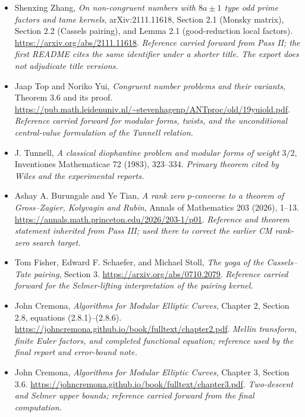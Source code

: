 \documentclass[11pt]{article}
\begin{document}
\begin{itemize}
\item[E3]\hypertarget{source:E3}{}Shenxing Zhang,
\emph{On non-congruent numbers with $8a\pm1$ type odd prime factors and tame kernels},
arXiv:2111.11618, Section 2.1 (Monsky matrix), Section 2.2 (Cassels pairing),
and Lemma 2.1 (good-reduction local factors).
\url{https://arxiv.org/abs/2111.11618}.
\textit{Reference carried forward from Pass II; the first README cites the same
identifier under a shorter title. The export does not adjudicate title versions.}

\item[E4]\hypertarget{source:E4}{}Jaap Top and Noriko Yui,
\emph{Congruent number problems and their variants}, Theorem 3.6 and its proof.
\url{https://pub.math.leidenuniv.nl/~stevenhagenp/ANTproc/old/19yuiold.pdf}.
\textit{Reference carried forward for modular forms, twists, and the unconditional
central-value formulation of the Tunnell relation.}

\item[E5]\hypertarget{source:E5}{}J. Tunnell,
\emph{A classical diophantine problem and modular forms of weight $3/2$},
Inventiones Mathematicae 72 (1983), 323--334.
\textit{Primary theorem cited by Wiles and the experimental reports.}

\item[E6]\hypertarget{source:E6}{}Ashay A. Burungale and Ye Tian,
\emph{A rank zero $p$-converse to a theorem of Gross--Zagier, Kolyvagin and Rubin},
Annals of Mathematics 203 (2026), 1--13.
\url{https://annals.math.princeton.edu/2026/203-1/p01}.
\textit{Reference and theorem statement inherited from Pass III; used there to
correct the earlier CM rank-zero search target.}

\item[E7]\hypertarget{source:E7}{}Tom Fisher, Edward F. Schaefer, and Michael Stoll,
\emph{The yoga of the Cassels--Tate pairing}, Section 3.
\url{https://arxiv.org/abs/0710.2079}.
\textit{Reference carried forward for the Selmer-lifting interpretation of the
pairing kernel.}

\item[E8]\hypertarget{source:E8}{}John Cremona,
\emph{Algorithms for Modular Elliptic Curves}, Chapter 2, Section 2.8,
equations (2.8.1)--(2.8.6).
\url{https://johncremona.github.io/book/fulltext/chapter2.pdf}.
\textit{Mellin transform, finite Euler factors, and completed functional equation;
reference used by the final report and error-bound note.}

\item[E9]\hypertarget{source:E9}{}John Cremona,
\emph{Algorithms for Modular Elliptic Curves}, Chapter 3, Section 3.6.
\url{https://johncremona.github.io/book/fulltext/chapter3.pdf}.
\textit{Two-descent and Selmer upper bounds; reference carried forward from the
final computation.}


\end{itemize}
\end{document}
